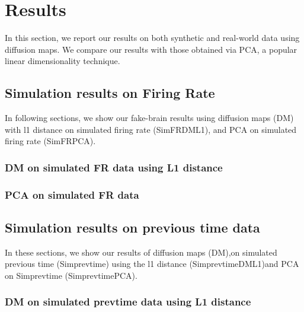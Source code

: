 
\section{Results}
In this section, we report our results on both synthetic and real-world data
using diffusion maps. We compare our results with those obtained via PCA, a popular linear dimensionality technique.

\subsection{Simulation results on Firing Rate}
In following sections, we show our fake-brain results using 
diffusion maps (DM) with l1 distance on simulated firing rate (SimFRDML1), and PCA  on simulated firing rate (SimFRPCA).


\subsubsection{DM on simulated FR data using L1 distance}

\begin{figure}[H]
  \centering
\end{figure}



\subsubsection{PCA on simulated FR  data}

\begin{figure}[H]
  \centering
\end{figure}


\subsection{Simulation results on previous time data}
In these sections, we show our results of diffusion maps (DM),on simulated previous time (Simprevtime) using the l1 distance (SimprevtimeDML1)and  PCA on Simprevtime (SimprevtimePCA).



\subsubsection{DM on simulated prevtime data using L1 distance}

